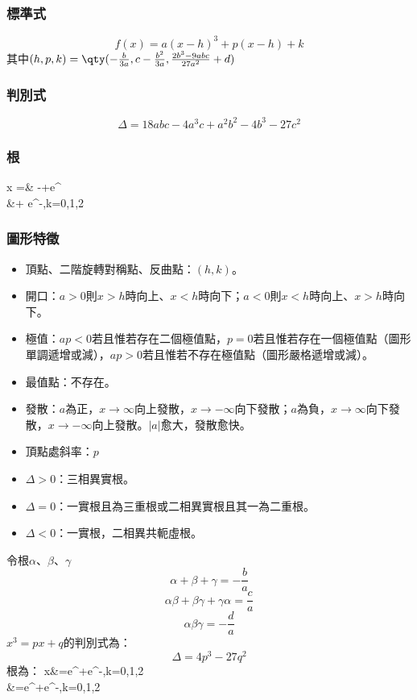 \documentclass[a4paper,12pt]{report}
\begin{document}
\subsubsection{標準式}
\[f(x)=a(x-h)^3+p(x-h)+k\]
其中$(h,p,k)=\qty(-\frac{b}{3a},c-\frac{b^2}{3a},\frac{2b^3-9abc}{27a^2}+d)$
\subsubsection{判別式}
\[\Delta = 18abc - 4a^3c + a^2b^2 - 4b^3 - 27c^2\]
\subsubsection{根}
\bma
x =& -+e^{}\\
&+ e^{-},\quad k=0,1,2
\eam
\subsubsection{圖形特徵}
\begin{itemize}
\item 頂點、二階旋轉對稱點、反曲點：$(h,k)$。
\item 開口：$a>0$則$x>h$時向上、$x<h$時向下；$a<0$則$x<h$時向上、$x>h$時向下。
\item 極值：$ap<0$若且惟若存在二個極值點，$p=0$若且惟若存在一個極值點（圖形單調遞增或減），$ap>0$若且惟若不存在極值點（圖形嚴格遞增或減）。
\item 最值點：不存在。
\item 發散：$a$為正，$x\to\infty$向上發散，$x\to -\infty$向下發散；$a$為負，$x\to\infty$向下發散，$x\to -\infty$向上發散。$|a|$愈大，發散愈快。
\item 頂點處斜率：$p$
\end{itemize}
\begin{itemize}
\item $\Delta>0$：三相異實根。
\item $\Delta=0$：一實根且為三重根或二相異實根且其一為二重根。
\item $\Delta<0$：一實根，二相異共軛虛根。
\end{itemize}
令根$\alpha$、$\beta$、$\gamma$
\[\alpha+\beta+\gamma=-\frac{b}{a}\]
\[\alpha\beta+\beta\gamma+\gamma\alpha=\frac{c}{a}\]
\[\alpha\beta\gamma=-\frac{d}{a}\]
$x^3=px+q$的判別式為：
\[\Delta=4p^3-27q^2\]
根為：
\bma
x&=e^{}+e^{-},\quad k=0,1,2\\
&=e^{}+e^{-},\quad k=0,1,2
\eam
\end{document}
